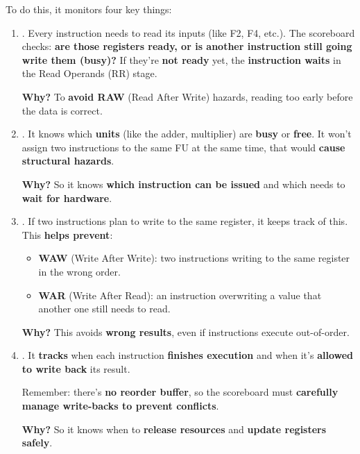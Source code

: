\highspace
To do this, it monitors four key things:
\begin{enumerate}
    \item {}. Every instruction needs to read its inputs (like F2, F4, etc.). The scoreboard checks: \textbf{are those registers ready, or is another instruction still going write them (busy)?} If they're \textbf{not ready} yet, the \textbf{instruction waits} in the Read Operands (RR) stage.

    \textcolor{Green3}{ \textbf{Why?}} To \textbf{avoid RAW} (Read After Write) hazards, reading too early before the data is correct.

    
    \item {}. It knows which \textbf{units} (like the adder, multiplier) are \textbf{busy} or \textbf{free}. It won't assign two instructions to the same FU at the same time, that would \textbf{cause structural hazards}.

    \textcolor{Green3}{ \textbf{Why?}} So it knows \textbf{which instruction can be issued} and which needs to \textbf{wait for hardware}.
    
    
    \item {}. If two instructions plan to write to the same register, it keeps track of this. This \textbf{helps prevent}:
    \begin{itemize}[label=\textcolor{Green3}{}]
        \item \textbf{WAW} (Write After Write): two instructions writing to the same register in the wrong order.
        \item \textbf{WAR} (Write After Read): an instruction overwriting a value that another one still needs to read.
    \end{itemize}

    \textcolor{Green3}{ \textbf{Why?}} This avoids \textbf{wrong results}, even if instructions execute out-of-order.
    
    
    \item {}. It \textbf{tracks} when each instruction \textbf{finishes execution} and when it's \textbf{allowed to write back} its result.

    Remember: there's \textbf{no reorder buffer}, so the scoreboard must \textbf{carefully manage write-backs to prevent conflicts}.

    \textcolor{Green3}{ \textbf{Why?}} So it knows when to \textbf{release resources} and \textbf{update registers safely}.
\end{enumerate}